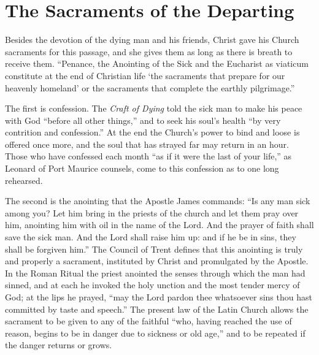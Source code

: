 \section{The Sacraments of the Departing}

Besides the devotion of the dying man and his friends, Christ gave his Church sacraments for this passage, and she gives them as long as there is breath to receive them. ``Penance, the Anointing of the Sick and the Eucharist as viaticum constitute at the end of Christian life `the sacraments that prepare for our heavenly homeland' or the sacraments that complete the earthly pilgrimage.''

The first is confession. The \emph{Craft of Dying} told the sick man to make his peace with God ``before all other things,'' and to seek his soul's health ``by very contrition and confession.'' At the end the Church's power to bind and loose is offered once more, and the soul that has strayed far may return in an hour. Those who have confessed each month ``as if it were the last of your life,'' as Leonard of Port Maurice counsels, come to this confession as to one long rehearsed.

The second is the anointing that the Apostle James commands: ``Is any man sick among you? Let him bring in the priests of the church and let them pray over him, anointing him with oil in the name of the Lord. And the prayer of faith shall save the sick man. And the Lord shall raise him up: and if he be in sins, they shall be forgiven him.'' The Council of Trent defines that this anointing is truly and properly a sacrament, instituted by Christ and promulgated by the Apostle. In the Roman Ritual the priest anointed the senses through which the man had sinned, and at each he invoked the holy unction and the most tender mercy of God; at the lips he prayed, ``may the Lord pardon thee whatsoever sins thou hast committed by taste and speech.'' The present law of the Latin Church allows the sacrament to be given to any of the faithful ``who, having reached the use of reason, begins to be in danger due to sickness or old age,'' and to be repeated if the danger returns or grows.

